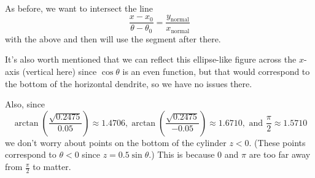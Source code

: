 \documentclass[a4paper,10pt]{article}
\begin{document}
As before, we want to intersect the line
\[\frac{x - x_0}{\theta - \theta_0} = \frac{y_{\text{normal}}}{
x_{\text{normal}}}\]
with the above and then will use the segment after there.

It's also worth mentioned that we can reflect this ellipse-like figure
across the \(x\)-axis (vertical here) since \(\cos \theta\) is an
even function, but that would correspond to the bottom of the horizontal
dendrite, so we have no issues there.

Also, since
\[\arctan\left(\frac{\sqrt{0.2475}}{0.05}\right) \approx 1.4706,
\arctan\left(\frac{\sqrt{0.2475}}{-0.05}\right) \approx 1.6710, \text{ and }
\frac{\pi}{2} \approx 1.5710\]
we don't worry about points on the bottom of the cylinder \(z < 0\). (These
points correspond to \(\theta < 0\) since \(z = 0.5 \sin \theta\).) This
is because \(0\) and \(\pi\) are too far away from \(\frac{\pi}{2}\)
to matter.
\end{document}
